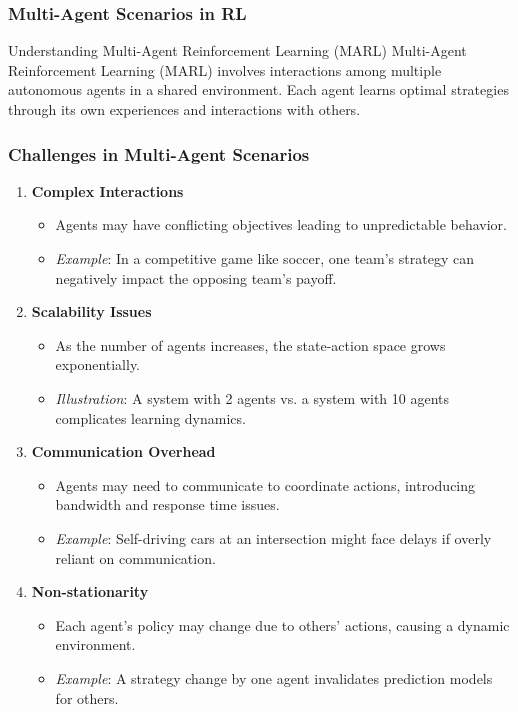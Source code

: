 \documentclass[aspectratio=169]{beamer}
\begin{document}
\begin{frame}[fragile]
  \frametitle{Multi-Agent Scenarios in RL}
  \begin{block}{Understanding Multi-Agent Reinforcement Learning (MARL)}
    Multi-Agent Reinforcement Learning (MARL) involves interactions among multiple autonomous agents in a shared environment.
    Each agent learns optimal strategies through its own experiences and interactions with others. 
  \end{block}
\end{frame}

\begin{frame}[fragile]
  \frametitle{Challenges in Multi-Agent Scenarios}
  \begin{enumerate}
    \item \textbf{Complex Interactions}
      \begin{itemize}
        \item Agents may have conflicting objectives leading to unpredictable behavior.
        \item \textit{Example}: In a competitive game like soccer, one team’s strategy can negatively impact the opposing team's payoff.
      \end{itemize}
    
    \item \textbf{Scalability Issues}
      \begin{itemize}
        \item As the number of agents increases, the state-action space grows exponentially.
        \item \textit{Illustration}: A system with 2 agents vs. a system with 10 agents complicates learning dynamics.
      \end{itemize}

    \item \textbf{Communication Overhead}
      \begin{itemize}
        \item Agents may need to communicate to coordinate actions, introducing bandwidth and response time issues.
        \item \textit{Example}: Self-driving cars at an intersection might face delays if overly reliant on communication.
      \end{itemize}

    \item \textbf{Non-stationarity}
      \begin{itemize}
        \item Each agent's policy may change due to others' actions, causing a dynamic environment.
        \item \textit{Example}: A strategy change by one agent invalidates prediction models for others.
      \end{itemize}
  \end{enumerate}
\end{frame}
\end{document}
